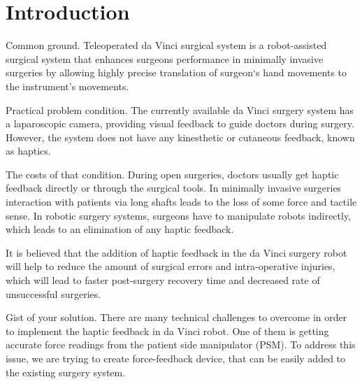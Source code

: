 \chapter{Introduction}
\label{intro} %


Common ground. Teleoperated da Vinci surgical system is a robot-assisted surgical system that enhances surgeons performance in minimally invasive surgeries by allowing highly precise translation of surgeon`s hand movements to the instrument's movements. 

Practical problem condition. The currently available da Vinci surgery system has a laparoscopic camera, providing visual feedback to guide doctors during surgery. However, the system does not have any kinesthetic or cutaneous feedback, known as haptics.\cite{_intuitive_2018} 

The costs of that condition. 
During open surgeries, doctors usually get haptic feedback directly or through the surgical tools. In minimally invasive surgeries interaction with patients via long shafts leads to the loss of some force and tactile sense. In robotic surgery systems, surgeons have to manipulate robots indirectly, which leads to an elimination of any haptic feedback. \cite{okamura_haptic_2009} 

It is believed that the addition of haptic feedback in the da Vinci surgery robot will help to reduce the amount of surgical errors and intra-operative injuries, which will lead to faster post-surgery recovery time and decreased rate of unsuccessful surgeries. \cite{reiley_effects_2008, van_der_meijden_value_2009, okamura_haptic_2009}

Gist of your solution. There are many technical challenges to overcome in order to implement the haptic feedback in da Vinci robot. One of them is getting accurate force readings from the patient side manipulator (PSM). To address this issue, we are trying to create force-feedback device, that can be easily added to the existing surgery system.